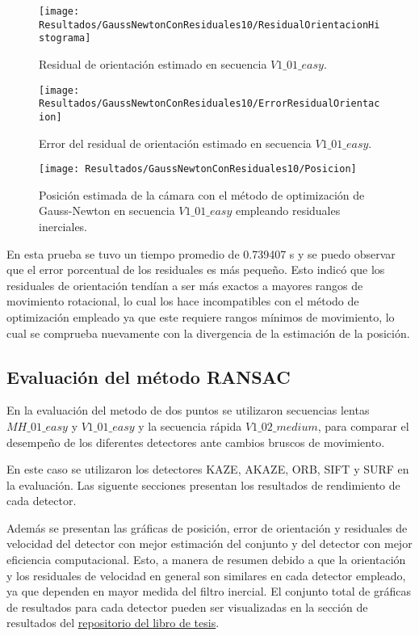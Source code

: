 \begin{figure}[H]
	\centering
	\texttt{[image: Resultados/GaussNewtonConResiduales10/ResidualOrientacionHistograma]}
	\caption{ Residual de orientación estimado en secuencia $V1\_ 01\_ easy$.}
	\label{imagen:Resultados/GaussNewtonConResiduales10/ResidualOrientacionHistograma}
\end{figure}

\begin{figure}[H]
	\centering
	\texttt{[image: Resultados/GaussNewtonConResiduales10/ErrorResidualOrientacion]}
	\caption{ Error del residual de orientación estimado en secuencia $V1\_ 01\_ easy$.}
	\label{imagen:Resultados/GaussNewtonConResiduales10/ErrorResidualOrientacion}
\end{figure}


\begin{figure}[H]
	\centering
	\texttt{[image: Resultados/GaussNewtonConResiduales10/Posicion]}
	\caption{Posición estimada de la cámara con el método de optimización de Gauss-Newton en secuencia $V1\_ 01\_ easy$ empleando residuales inerciales. }
	\label{imagen:Resultados/GaussNewtonConResiduales10/Posicion}
\end{figure}

En esta prueba se tuvo un tiempo promedio de 0.739407 s y se puedo observar que el error porcentual de los residuales es más pequeño. Esto indicó que los residuales de orientación tendían a ser más exactos a mayores rangos de movimiento rotacional, lo cual los hace incompatibles con el método de optimización empleado ya que este requiere rangos mínimos de movimiento, lo cual se comprueba nuevamente con la divergencia de la estimación de la posición.

\subsection{Evaluación del método RANSAC}

En la evaluación del metodo de dos puntos se utilizaron secuencias lentas $MH\_ 01\_ easy$ y $V1\_ 01\_ easy$ y la secuencia rápida $V1\_ 02\_ medium$, para comparar el desempeño de los diferentes detectores ante cambios bruscos de movimiento. 

En este caso se utilizaron los detectores KAZE, AKAZE, ORB, SIFT y SURF en la evaluación. Las siguente secciones presentan los resultados de rendimiento de cada detector.

 Además se presentan las gráficas de posición, error de orientación y residuales de velocidad del detector con mejor estimación del conjunto y del detector con mejor eficiencia computacional. Esto, a manera de resumen debido a que la orientación y los residuales de velocidad en general son similares en cada detector empleado, ya que dependen en mayor medida del filtro inercial.  El conjunto total de gráficas de resultados para cada detector pueden ser visualizadas en la sección de resultados del  \href{https://github.com/Lujano/tesis/tree/master/imagenes/Resultados/}{\underline{repositorio del libro de tesis}}.
 
